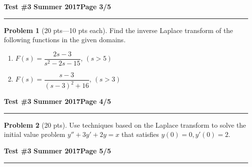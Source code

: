 \documentclass[12pt]{article}
\theoremstyle{definition}
\newtheorem{problem}{Problem}
\begin{document}
\newpage
\hfill{\large\bf Test \#3}\hfill{\large\bf
  Summer 2017}\hfill{\large\bf Page 3/5}\hrule

\bigskip
\begin{problem}[20 pts---10 pts each]
Find the inverse Laplace transform of the following functions in the given domains.
\begin{enumerate}
  \item $F(s) = \dfrac{2s-3}{s^2-2s-15}$, $(s>5)$
  \vspace{8cm}
  \begin{flushright}
  \end{flushright} 
  \item $F(s) =\dfrac{s-3}{(s-3)^2+16}$, $(s>3)$
  \vspace{8cm}
  \begin{flushright}
  \end{flushright} 
\end{enumerate}
\end{problem}
\newpage

\hfill{\large\bf Test \#3}\hfill{\large\bf
  Summer 2017}\hfill{\large\bf Page 4/5}\hrule

\bigskip
\begin{problem}[20 pts]
Use techniques based on the Laplace transform to solve the initial value problem $y''+3y'+2y=x$ that satisfies $y(0)=0, y'(0)=2$.
\vspace{20cm}
\begin{flushright}
\end{flushright}
\end{problem}
\newpage

\hfill{\large\bf Test \#3}\hfill{\large\bf
  Summer 2017}\hfill{\large\bf Page 5/5}\hrule
\end{document}
